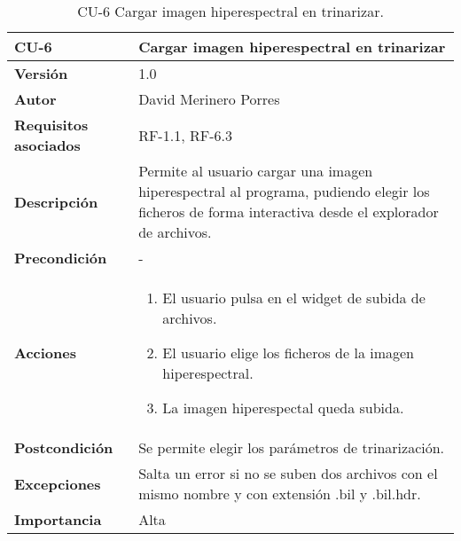 \begin{table}[p]
	\centering
	\begin{tabularx}{\linewidth}{ p{} p{} }
		\toprule
		\textbf{CU-6}    & \textbf{Cargar imagen hiperespectral en trinarizar}\\
		\toprule
		\textbf{Versión}              & 1.0    \\
		\textbf{Autor}                & David Merinero Porres \\
		\textbf{Requisitos asociados} & RF-1.1, RF-6.3 \\
		\textbf{Descripción}          & Permite al usuario cargar una imagen hiperespectral al programa, pudiendo elegir los ficheros de forma interactiva desde el explorador de archivos. \\
		\textbf{Precondición}         & - \\
		\textbf{Acciones}             &
		\begin{enumerate}
			\def\labelenumi{\arabic{enumi}.}
			\tightlist
			\item El usuario pulsa en el widget de subida de archivos.
			\item El usuario elige los ficheros de la imagen hiperespectral.
                \item La imagen hiperespectal queda subida.
   
		\end{enumerate}\\
		\textbf{Postcondición}        & Se permite elegir los parámetros de trinarización. \\
		\textbf{Excepciones}          & Salta un error si no se suben dos archivos con el mismo nombre y con extensión .bil y .bil.hdr. \\
		\textbf{Importancia}          & Alta \\
		\bottomrule
	\end{tabularx}
	\caption{CU-6 Cargar imagen hiperespectral en trinarizar.}
\end{table}

